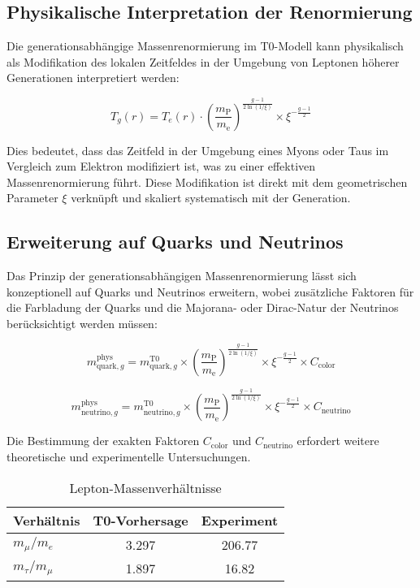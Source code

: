 \documentclass[12pt,a4paper]{article}
\theoremstyle{definition}
\begin{document}
\subsection{Physikalische Interpretation der Renormierung}

Die generationsabhängige Massenrenormierung im T0-Modell kann physikalisch als Modifikation des lokalen Zeitfeldes in der Umgebung von Leptonen höherer Generationen interpretiert werden:

\begin{equation}
	T_g(r) = T_e(r) \cdot \left(\frac{m_{\text{P}}}{m_{\text{e}}}\right)^{\frac{g-1}{2\ln(1/\xi)}} \times \xi^{-\frac{g-1}{2}}
\end{equation}

Dies bedeutet, dass das Zeitfeld in der Umgebung eines Myons oder Taus im Vergleich zum Elektron modifiziert ist, was zu einer effektiven Massenrenormierung führt. Diese Modifikation ist direkt mit dem geometrischen Parameter $\xi$ verknüpft und skaliert systematisch mit der Generation.

\subsection{Erweiterung auf Quarks und Neutrinos}

Das Prinzip der generationsabhängigen Massenrenormierung lässt sich konzeptionell auf Quarks und Neutrinos erweitern, wobei zusätzliche Faktoren für die Farbladung der Quarks und die Majorana- oder Dirac-Natur der Neutrinos berücksichtigt werden müssen:

\begin{equation}
	m_{\text{quark},g}^{\text{phys}} = m_{\text{quark},g}^{\text{T0}} \times \left(\frac{m_{\text{P}}}{m_{\text{e}}}\right)^{\frac{g-1}{2\ln(1/\xi)}} \times \xi^{-\frac{g-1}{2}} \times C_{\text{color}}
\end{equation}

\begin{equation}
	m_{\text{neutrino},g}^{\text{phys}} = m_{\text{neutrino},g}^{\text{T0}} \times \left(\frac{m_{\text{P}}}{m_{\text{e}}}\right)^{\frac{g-1}{2\ln(1/\xi)}} \times \xi^{-\frac{g-1}{2}} \times C_{\text{neutrino}}
\end{equation}

Die Bestimmung der exakten Faktoren $C_{\text{color}}$ und $C_{\text{neutrino}}$ erfordert weitere theoretische und experimentelle Untersuchungen.
\begin{table}[htbp]
	\centering
	\begin{tabular}{lcc}
		\toprule
		Verhältnis & T0-Vorhersage & Experiment \\
		\midrule
		$m_\mu/m_e$ & 3.297 & 206.77 \\
		$m_\tau/m_\mu$ & 1.897 & 16.82 \\
		\bottomrule
	\end{tabular}
	\caption{Lepton-Massenverhältnisse}
\end{table}
\end{document}
